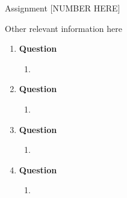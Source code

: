 \documentclass[a4paper]{article}
\begin{document}
\centerline {\sc \large Assignment [NUMBER HERE]}
\centerline{\footnotesize {Other relevant information here}}
\vspace{2pc}

\begin{enumerate}
	\item \textbf{Question }
		\begin{enumerate}
			\item
		\end{enumerate}
	
	\item \textbf{Question }
		\begin{enumerate}
			\item
		\end{enumerate}
			
	\item \textbf{Question }
		\begin{enumerate}
			\item
		\end{enumerate}
			
	\item \textbf{Question }
		\begin{enumerate}
			\item
		\end{enumerate}
			
\end{enumerate}
	
\end{document}
